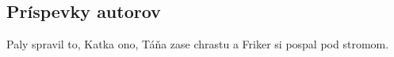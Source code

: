 \subsection{Príspevky autorov}
Paly spravil to, Katka ono, Táňa zase chrastu a Friker si pospal pod stromom.